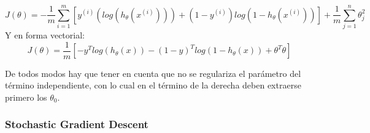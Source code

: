 \begin{equation}
J(\theta) = -\frac{1}{m}\sum_{i = 1}^{m}\left[y^{(i)}(log(h_\theta(x^{(i)}))) + (1-y^{(i)})log(1-h_\theta(x^{(i)}))\right] + \frac{1}{m}\sum_{j = 1}^{n}\theta_j^2
\end{equation}
Y en forma vectorial:
\begin{equation}
J(\theta) = \frac{1}{m}\left[ -y^Tlog(h_\theta(x)) - (1-y)^Tlog(1-h_\theta(x)) + \theta^T\theta\right]
\end{equation}

De todos modos hay que tener en cuenta que no se regulariza el parámetro del término independiente, con lo cual en el término de la derecha deben extraerse primero los $\theta_0$.

\subsubsection{Stochastic Gradient Descent}
